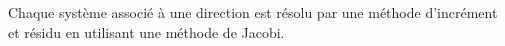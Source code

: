 Chaque syst\`eme associ\'e \`a une direction est r\'esolu par une m\'ethode
d'incr\'ement et r\'esidu en utilisant une m\'ethode de Jacobi.




